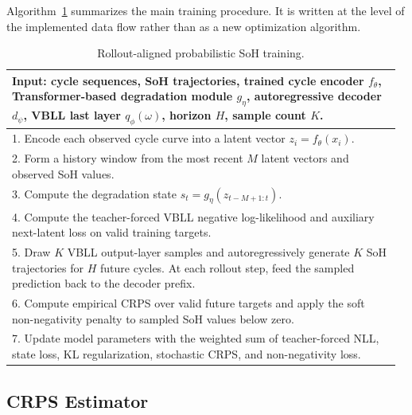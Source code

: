 \documentclass[conference]{IEEEtran}
\begin{document}
Algorithm~\ref{alg:rollout-training} summarizes the main training procedure.
It is written at the level of the implemented data flow rather than as a new
optimization algorithm.

\begin{table}[h]
\centering
\scriptsize
\caption{Rollout-aligned probabilistic SoH training.}
\label{alg:rollout-training}
\begin{tabular}{@{}p{0.97\linewidth}@{}}
\toprule
\textbf{Input:} cycle sequences, SoH trajectories, trained cycle encoder
$f_\theta$, Transformer-based degradation module $g_\eta$, autoregressive decoder
$d_\psi$, VBLL last layer $q_\phi(\omega)$, horizon $H$, sample count $K$. \\
\midrule
1. Encode each observed cycle curve into a latent vector
$z_i=f_\theta(x_i)$. \\
2. Form a history window from the most recent $M$ latent vectors and observed
SoH values. \\
3. Compute the degradation state $s_t=g_\eta(z_{t-M+1:t})$. \\
4. Compute the teacher-forced VBLL negative log-likelihood and auxiliary
next-latent loss on valid training targets. \\
5. Draw $K$ VBLL output-layer samples and autoregressively generate $K$ SoH
trajectories for $H$ future cycles. At each rollout step, feed the sampled
prediction back to the decoder prefix. \\
6. Compute empirical CRPS over valid future targets and apply the soft
non-negativity penalty to sampled SoH values below zero. \\
7. Update model parameters with the weighted sum of teacher-forced NLL,
state loss, KL regularization, stochastic CRPS, and non-negativity loss. \\
\bottomrule
\end{tabular}
\end{table}

\subsection{CRPS Estimator}
\end{document}
